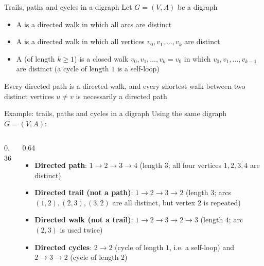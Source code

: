 \documentclass[aspectratio=169]{beamer}\usepackage[]{graphicx}\usepackage[]{xcolor}
\begin{document}
\begin{frame}{Trails, paths and cycles in a digraph}
Let $G = (V, A)$ be a digraph
\vfill
\begin{definition}
\begin{itemize}
\item A  is a directed walk in which all arcs are distinct
\item A  is a directed walk in which all vertices $v_0, v_1, \ldots, v_k$ are distinct
\item A  (of length $k \ge 1$) is a closed walk $v_0, v_1, \ldots, v_k = v_0$ in which $v_0, v_1, \ldots, v_{k-1}$ are distinct (a cycle of length $1$ is a self-loop)
\end{itemize}
\end{definition}
\vfill
Every directed path is a directed walk, and every shortest walk between two distinct vertices $u \neq v$ is necessarily a directed path
\end{frame}

\begin{frame}{Example: trails, paths and cycles in a digraph}
Using the same digraph $G = (V, A)$:
\vfill
\begin{columns}[c]
\begin{column}{0.36\textwidth}
\centering
{}
\end{column}
\begin{column}{0.64\textwidth}
\begin{itemize}
\item \textbf{Directed path}: $1 \to 2 \to 3 \to 4$ (length $3$; all four vertices $1, 2, 3, 4$ are distinct)
\vfill
\item \textbf{Directed trail (not a path)}: $1 \to 2 \to 3 \to 2$ (length $3$; arcs $(1, 2), (2, 3), (3, 2)$ are all distinct, but vertex $2$ is repeated)
\vfill
\item \textbf{Directed walk (not a trail)}: $1 \to 2 \to 3 \to 2 \to 3$ (length $4$; arc $(2, 3)$ is used twice)
\vfill
\item \textbf{Directed cycles}: $2 \to 2$ (cycle of length $1$, i.e. a self-loop) and $2 \to 3 \to 2$ (cycle of length $2$)
\end{itemize}
\end{column}
\end{columns}
\end{frame}
\end{document}
